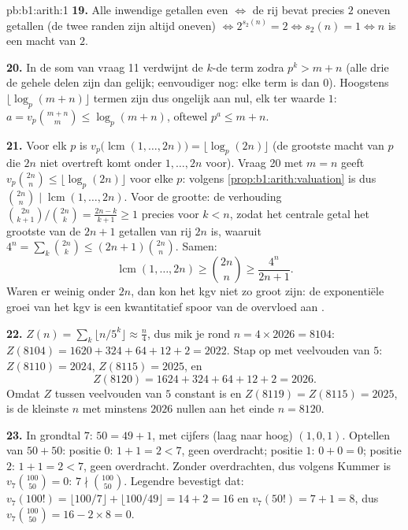 \begin{solution}{pb:b1:arith:1}
\textbf{19.} Alle inwendige getallen even $\iff$ de rij bevat precies $2$
oneven getallen (de twee randen zijn altijd oneven) $\iff 2^{s_2(n)} = 2
\iff s_2(n) = 1 \iff n$ is een macht van $2$.

\textbf{20.} In de som van vraag 11 verdwijnt de $k$-de term zodra $p^k >
m + n$ (alle drie de gehele delen zijn dan gelijk; eenvoudiger nog: elke
term is dan $0$). Hoogstens $\lfloor \log_p(m+n)\rfloor$ termen zijn dus
ongelijk aan nul, elk ter waarde $1$: $a = v_p\binom{m+n}m \leq
\log_p(m+n)$, oftewel $p^a \leq m + n$.

\textbf{21.} Voor elk  $p$ is
$v_p\bigl(\operatorname{lcm}(1, \dots, 2n)\bigr) =
\lfloor\log_p(2n)\rfloor$ (de grootste macht van $p$ die $2n$ niet
overtreft komt onder $1, \dots, 2n$ voor). Vraag 20 met $m = n$ geeft
$v_p\binom{2n}n \leq \lfloor\log_p(2n)\rfloor$ voor elke $p$: volgens
\cref{prop:b1:arith:valuation} is dus $\binom{2n}n \mid
\operatorname{lcm}(1, \dots, 2n)$. Voor de grootte: de verhouding
$\binom{2n}{k+1}/\binom{2n}k = \frac{2n-k}{k+1} \geq 1$ precies voor $k <
n$, zodat het centrale getal het grootste van de $2n + 1$ getallen van
rij $2n$ is, waaruit $4^n = \sum_k \binom{2n}k \leq (2n+1)\binom{2n}n$.
Samen:
\[
\operatorname{lcm}(1, \dots, 2n) \geq \binom{2n}n \geq
\frac{4^n}{2n + 1} .
\]
Waren er weinig  onder $2n$, dan kon het kgv niet zo groot
zijn: de exponentiële groei van het kgv is een kwantitatief spoor van de
overvloed aan .

\textbf{22.} $Z(n) = \sum_k\lfloor n/5^k\rfloor \approx \frac n4$, dus
mik je rond $n = 4 \times 2026 = 8104$: $Z(8104) = 1620 + 324 + 64 + 12 +
2 = 2022$. Stap op met veelvouden van $5$: $Z(8110) = 2024$, $Z(8115) =
2025$, en
\[
Z(8120) = 1624 + 324 + 64 + 12 + 2 = 2026 .
\]
Omdat $Z$ tussen veelvouden van $5$ constant is en $Z(8119) = Z(8115) =
2025$, is de kleinste $n$ met minstens $2026$ nullen aan het einde $n =
8120$.

\textbf{23.} In grondtal $7$: $50 = 49 + 1$, met cijfers (laag naar hoog)
$(1, 0, 1)$. Optellen van $50 + 50$: positie $0$: $1 + 1 = 2 < 7$, geen
overdracht; positie $1$: $0 + 0 = 0$; positie $2$: $1 + 1 = 2 < 7$, geen
overdracht. Zonder overdrachten, dus volgens Kummer is
$v_7\binom{100}{50} = 0$: $7 \nmid \binom{100}{50}$. Legendre bevestigt
dat: $v_7(100!) = \lfloor 100/7 \rfloor + \lfloor 100/49 \rfloor = 14 + 2
= 16$ en $v_7(50!) = 7 + 1 = 8$, dus $v_7\binom{100}{50} = 16 - 2\times8
= 0$.


\end{solution}
